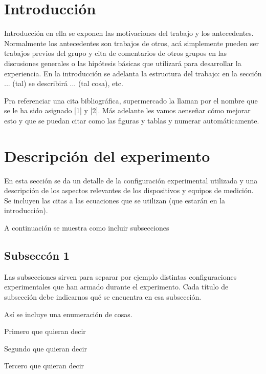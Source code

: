 \documentclass[twoside]{article}
\begin{document}
\begin{multicols}{2} %

\section{Introducci\'on}


Introducción en ella se exponen las motivaciones del trabajo y los antecedentes. Normalmente los antecedentes son trabajos de otros, acá simplemente pueden ser trabajos previos del grupo y cita de comentarios de otros grupos en las discusiones generales o las hipótesis básicas que utilizará para desarrollar la experiencia. En la introducción se adelanta la estructura del trabajo: en la sección ... (tal) se describirá ... (tal cosa), etc.  %

Pra referenciar una cita bibliográfica, su\-per\-mer\-ca\-do la llaman por el nombre que se le ha sido asignado [1] y [2].
Más adelante les vamos aenseñar cómo mejorar esto y que se puedan citar como las figuras y tablas y numerar automáticamente.


\section{Descripci\'on del experimento}

 En esta sección se da un detalle de la configuración experimental utilizada y una descripción de los aspectos relevantes de los dispositivos y equipos de medición. Se incluyen las citas a las ecuaciones que se utilizan (que estarán en la introducción).

A continuación se muestra como incluir subsecciones

\subsection{Subsecc\'on 1}

Las subsecciones sirven para separar por ejemplo distintas configuraciones experimentales que han armado durante el experimento. Cada título de subsección debe indicarnos qué se encuentra en esa subsección. 

Así se incluye una enumeración de cosas.

\begin{compactitem}
\item Primero que quieran decir
\item Segundo que quieran decir
\item Tercero que quieran decir
\end{compactitem}


\end{multicols}
\end{document}
